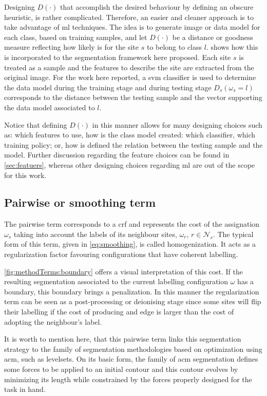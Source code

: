 Designing $D(\cdot)$ that accomplish the desired behaviour by defining an obscure heuristic, is rather complicated. 
Therefore, an easier and cleaner approach is to take advantage of \ac{ml} techniques. 
The idea is to generate image or data model for each class, based on training samples, and let $D(\cdot)$ be a distance or goodness measure reflecting how likely is for the site $s$ to belong to class $l$.
 shows how this is incorporated to the segmentation framework here proposed.
Each site $s$ is treated as a sample and the features to describe the site are extracted from the original image. 
For the work here reported, a \ac{svm} classifier is used to determine the data model during the training stage and during testing stage $D_s(\omega_s=l)$ corresponds to the distance between the testing sample and the vector supporting the data model associated to $l$. 

Notice that defining $D(\cdot)$ in this manner allows for many designing choices such as: which features to use, how is the class model created: which classifier, which training policy; or, how is defined the relation between the testing sample and the model.
Further discussion regarding the feature choices can be found in \cref{sec:featuers}, whereas other designing choices regarding \ac{ml} are out of the scope for this work.

\subsection{Pairwise or smoothing term} \label{sec:method:mrfTerm}
 
The pairwise term corresponds to a \ac{crf} and represents the cost of the assignation $\omega_s$ taking into account the labels of its neighbour sites, $\omega_r$, $r \in \mathcal{N}_{s}$. 
The typical form of this term, given in \cref{eq:smoothing}, is called homogenization.
It acts as a regularization factor favouring configurations that have coherent labelling.

\cref{fig:methodTerms:boundary} offers a visual interpretation of this cost.
If the resulting segmentation associated to the current labelling configuration $\omega$ has a boundary, this boundary brings a penalization. 
In this manner the regularization term can be seen as a post-processing or deionising stage since some sites will flip their labelling if the cost of producing and edge is larger than the cost of adopting the neighbour's label. 

It is worth to mention here, that this pairwise term links this segmentation strategy to the family of segmentation methodologies based on optimization using \ac{acm}, such as levelsets.
On its basic form, the family of \ac{acm} segmentation defines some forces to be applied to an initial contour and this contour evolves by minimizing its length while constrained by the forces properly designed for the task in hand.

